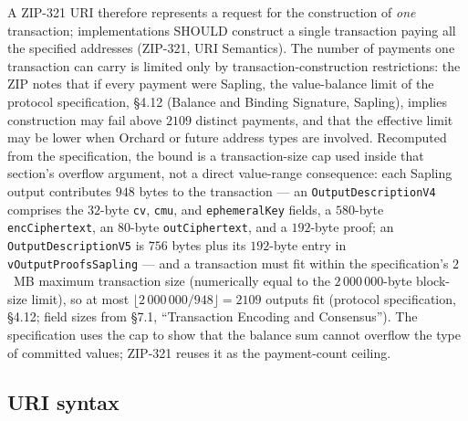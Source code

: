 \documentclass[11pt,a4paper]{article}
\theoremstyle{definition}
\begin{document}
A ZIP-321 URI therefore represents a request for the construction of
\emph{one} transaction; implementations SHOULD construct a single transaction
paying all the specified addresses (ZIP-321, URI Semantics). The number of
payments one transaction can carry is limited only by
transaction-construction restrictions: the ZIP notes that if every payment
were Sapling, the value-balance limit of the protocol specification,
\S4.12 (Balance and Binding Signature, Sapling), implies construction may
fail above $2109$ distinct payments, and that the effective limit may be
lower when Orchard or future address types are involved.
Recomputed from the specification, the bound is a transaction-size cap
used inside that section's overflow argument, not a direct value-range
consequence: each Sapling output contributes $948$ bytes to the
transaction --- an \texttt{OutputDescriptionV4} comprises the $32$-byte
\texttt{cv}, \texttt{cmu}, and \texttt{ephemeralKey} fields, a
$580$-byte \texttt{encCiphertext}, an $80$-byte \texttt{outCiphertext},
and a $192$-byte proof; an \texttt{OutputDescriptionV5} is $756$ bytes
plus its $192$-byte entry in \texttt{vOutputProofsSapling} --- and a
transaction must fit within the specification's $2$~MB maximum
transaction size (numerically equal to the $2\,000\,000$-byte block-size
limit), so at most $\lfloor 2\,000\,000 / 948 \rfloor = 2109$ outputs fit
(protocol specification, \S4.12; field sizes from \S7.1, ``Transaction
Encoding and Consensus''). The specification uses the cap to show that
the balance sum cannot overflow the type of committed values; ZIP-321
reuses it as the payment-count ceiling.

\subsection{URI syntax}\label{sec:zip321-syntax}
\end{document}
